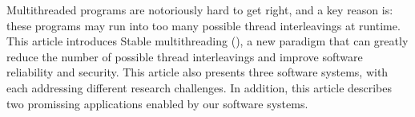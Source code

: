 
Multithreaded programs are notoriously hard to get right, and a key reason is: 
these programs may run into too many possible thread interleavings at runtime. 
This article introduces Stable multithreading (\smt), a new paradigm that can greatly 
 reduce the number of possible thread interleavings and improve software 
 reliability and security. This article also presents three \smt software 
 systems, with each addressing different research challenges. In addition, this 
 article describes two promissing applications enabled by our software systems.
